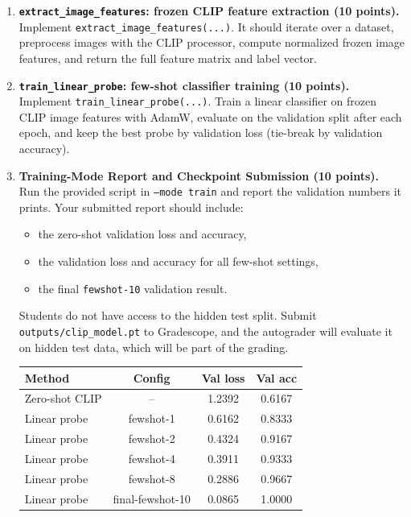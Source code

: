 \begin{Q}
\begin{enumerate}
\item \textbf{\texttt{extract\_image\_features}: frozen CLIP feature extraction (10 points).}\\
Implement \texttt{extract\_image\_features(...)}.
It should iterate over a dataset, preprocess images with the CLIP processor, compute normalized frozen image features, and return the full feature matrix and label vector.

\item \textbf{\texttt{train\_linear\_probe}: few-shot classifier training (10 points).}\\
Implement \texttt{train\_linear\_probe(...)}.
Train a linear classifier on frozen CLIP image features with AdamW, evaluate on the validation split after each epoch, and keep the best probe by validation loss (tie-break by validation accuracy).

\item \textbf{Training-Mode Report and Checkpoint Submission (10 points).}\\
Run the provided script in \texttt{--mode train} and report the validation numbers it prints.
Your submitted report should include:
\begin{itemize}
\item the zero-shot validation loss and accuracy,
\item the validation loss and accuracy for all few-shot settings,
\item the final \texttt{fewshot-10} validation result.
\end{itemize}
Students do not have access to the hidden test split. Submit \texttt{outputs/clip\_model.pt} to Gradescope, and the autograder will evaluate it on hidden test data, which will be part of the grading.

\begin{solution}

\begin{tabular}{lccc}
\hline
Method & Config & Val loss & Val acc \\
\hline
Zero-shot CLIP & -- & 1.2392 & 0.6167 \\
Linear probe & fewshot-1 & 0.6162 & 0.8333 \\
Linear probe & fewshot-2 & 0.4324 & 0.9167 \\
Linear probe & fewshot-4 & 0.3911 & 0.9333 \\
Linear probe & fewshot-8 & 0.2886 & 0.9667 \\
Linear probe & final-fewshot-10 & 0.0865 & 1.0000 \\
\hline
\end{tabular}



\end{solution}
\end{enumerate}
\end{Q}
